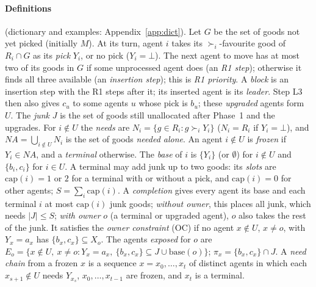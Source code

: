 \documentclass[runningheads,11pt]{llncs}
\newcommand{\NA}{\mathit{NA}}
\newcommand{\capa}{\mathrm{cap}}
\newcommand{\base}{\mathrm{base}}
\newcommand{\none}{\bot}
\newcommand{\st}{\mathrel{:}}
\begin{document}
\paragraph{Definitions} (dictionary and examples: Appendix~\ref{app:dict}). Let $G$ be the set of goods not yet picked (initially $M$). At its turn, agent $i$ takes its $\succ_i$-favourite good of $R_i\cap G$ as its \emph{pick} $Y_i$, or no pick ($Y_i=\none$). The next agent to move has at most two of its goods in $G$ if some unprocessed agent does (an \emph{R1 step}); otherwise it finds all three available (an \emph{insertion step}); this is \emph{R1 priority}. A \emph{block} is an insertion step with the R1 steps after it; its inserted agent is its \emph{leader}. Step L3 then also gives $c_u$ to some agents $u$ whose pick is $b_u$; these \emph{upgraded} agents form $U$. The \emph{junk} $J$ is the set of goods still unallocated after Phase~1 and the upgrades. For $i\notin U$ the \emph{needs} are $N_i=\{g\in R_i\st g\succ_i Y_i\}$ ($N_i=R_i$ if $Y_i=\none$), and $\NA=\bigcup_{i\notin U}N_i$ is the set of goods \emph{needed alone}. An agent $i\notin U$ is \emph{frozen} if $Y_i\in\NA$, and a \emph{terminal} otherwise. The \emph{base} of $i$ is $\{Y_i\}$ (or $\emptyset$) for $i\notin U$ and $\{b_i,c_i\}$ for $i\in U$. A terminal may add junk up to two goods: its \emph{slots} are $\capa(i)=1$ or $2$ for a terminal with or without a pick, and $\capa(i)=0$ for other agents; $S=\sum_i\capa(i)$. A \emph{completion} gives every agent its base and each terminal $i$ at most $\capa(i)$ junk goods; \emph{without owner}, this places all junk, which needs $|J|\le S$; \emph{with owner} $o$ (a terminal or upgraded agent), $o$ also takes the rest of the junk. It satisfies the \emph{owner constraint} (OC) if no agent $x\notin U$, $x\ne o$, with $Y_x=a_x$ has $\{b_x,c_x\}\subseteq X_o$. The agents \emph{exposed} for $o$ are $E_o=\{x\notin U,\ x\ne o\st Y_x=a_x,\ \{b_x,c_x\}\subseteq J\cup\base(o)\}$; $\pi_x=\{b_x,c_x\}\cap J$. A \emph{need chain} from a frozen $x$ is a sequence $x=x_0,\dots,x_t$ of distinct agents in which each $x_{s+1}\notin U$ needs $Y_{x_s}$, $x_0,\dots,x_{t-1}$ are frozen, and $x_t$ is a terminal.
\end{document}
